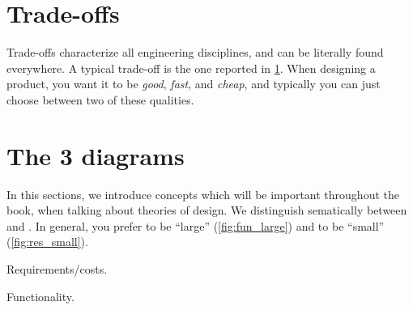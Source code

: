 \section{Trade-offs}

Trade-offs characterize all engineering disciplines, and can be literally found everywhere. A typical trade-off is the one reported in \cref{fig:fast_good_cheap}. When designing a product, you want it to be \emph{good}, \emph{fast}, and \emph{cheap}, and typically you can just choose between two of these qualities.

\begin{figure}[h!]
  \begin{center}
  \end{center}
  \caption{}
  \label{fig:fast_good_cheap}
\end{figure}


\section{The 3 diagrams}


\devel{} %

In this sections, we introduce concepts which will be important throughout the book, when talking about theories of design.
We distinguish sematically between  and .
In general, you prefer  to be ``large'' (\cref{fig:fun_large}) and  to be ``small'' (\cref{fig:res_small}).

\begin{marginfigure}
  \begin{center}
\end{center}
   \caption{Requirements/costs. \label{fig:res_small}}

\end{marginfigure}

\begin{marginfigure}
  \begin{center}
  \end{center}
  \caption{Functionality. \label{fig:fun_large}}
\end{marginfigure}

